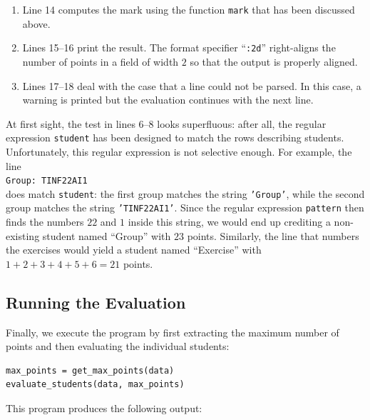 \begin{enumerate}
      extract the list of all scores from this string.  These strings are converted into integers and are then
      added up using the function \texttt{sum}.
\item Line 14 computes the mark using the function \texttt{mark} that has been discussed above.
\item Lines 15--16 print the result.  The format specifier ``\texttt{:2d}'' right-aligns the number of points in
      a field of width $2$ so that the output is properly aligned.
\item Lines 17--18 deal with the case that a line could not be parsed.  In this case, a warning is printed but
      the evaluation continues with the next line.
\end{enumerate}

\remarkEng
At first sight, the test in lines 6--8 looks superfluous: after all, the regular expression
\texttt{student} has been designed to match the rows describing students.  Unfortunately, this regular
expression is not selective enough.  For example, the line
\\[0.2cm]
\hspace*{1.3cm}
\texttt{Group: TINF22AI1}
\\[0.2cm]
does match \texttt{student}: the first group matches the string \texttt{'Group'}, while the second group
matches the string \texttt{'TINF22AI1'}.  Since the regular expression \texttt{pattern} then finds the
numbers $22$ and $1$ inside this string, we would end up crediting a non-existing student named ``Group'' with
$23$ points.  Similarly, the line that numbers the exercises would yield a student named ``Exercise'' with
$1+2+3+4+5+6 = 21$ points.

\subsection{Running the Evaluation}
Finally, we execute the program by first extracting the maximum number of points and then evaluating the
individual students:

\begin{verbatim}
max_points = get_max_points(data)
evaluate_students(data, max_points)
\end{verbatim}

\noindent
This program produces the following output:

